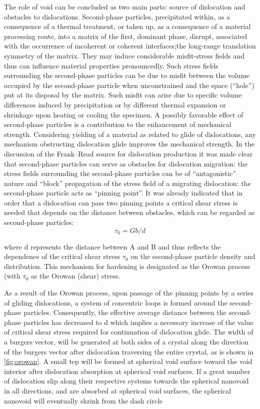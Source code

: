 \documentclass[metals,article,submit,moreauthors,pdftex,10pt,a4paper]{Definitions/mdpi}
\begin{document}
The role of void can be concluded as two main parts: source of dislocation and obstacles to dislocations.  Second-phase particles, precipitated within, as a consequence of a thermal treatment, or taken up, as a consequence of a material processing route, into a matrix of the first, dominant phase, disrupt, associated with the occurrence of incoherent or coherent interfaces;the long-range translation symmetry of the matrix. They may induce considerable misfit-stress fields and thus can influence material properties pronouncedly. Such stress fields surrounding the second-phase particles can be due to misfit between the volume occupied by the second-phase particle when unconstrained and the space (“hole”) put at its disposal by the matrix. Such misfit can arise due to specific volume differences induced by precipitation or by different thermal expansion or shrinkage upon heating or cooling the specimen. A possibly favorable effect of second-phase particles is a contribution to the enhancement of mechanical strength. Considering yielding of a material as related to glide of dislocations, any mechanism obstructing dislocation glide improves the mechanical strength. In the discussion of the Frank–Read source for dislocation production  it was made clear that second-phase particles can serve as obstacles for dislocation migration: the stress fields surrounding the second-phase particles can be of “antagonistic” nature and “block” propagation of the stress field of a migrating dislocation: the second-phase particle acts as “pinning point”. It was already indicated that in order that a dislocation can pass two pinning points a critical shear stress is needed that depends on the distance between  obstacles, which can be regarded as second-phase particles:
\begin{equation} \label{eq:orowan} 
\tau_0 = Gb/d
\end{equation}

where d represents the distance between A and B and thus reflects the dependence of the critical shear stress $\tau_0$ on the second-phase particle density and distribution. This mechanism for hardening is designated as the Orowan process (with $\tau_0$ as the Orowan (shear) stress.

As a result of the Orowan process, upon passage of the pinning points by a series of gliding dislocations, a system of concentric loops is formed around the second-phase particles. Consequently, the effective average distance between the second-phase particles has decreased to d which implies a necessary increase of the value of critical shear stress required for continuation of dislocation glide. The width of a burgers vector, will be generated at both sides of a crystal along the direction of the burgers vector after dislocation traversing the entire crystal, as is shown in \ref{fig:orowan}. A small tep will be formed at spherical void surface toward the void interior after dislocation absorption at spherical void surfaces. If a great number of dislocation slip along their respective systems towards the spherical nanovoid in all directions, and are absorbed at spherical void surfaces, the spherical nanovoid will eventually shrink from the dash circle 
\end{document}
